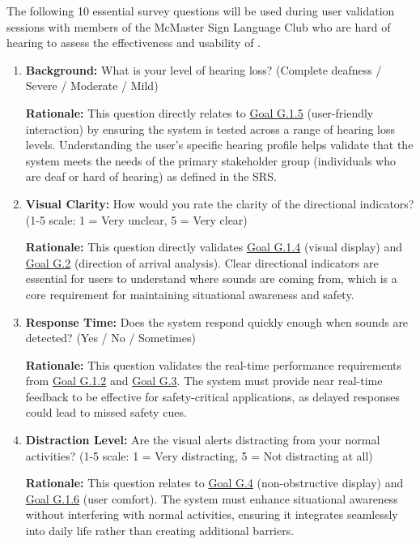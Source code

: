 \documentclass[12pt, titlepage]{article}
\begin{document}
The following 10 essential survey questions will be used during user validation
sessions with members of the McMaster Sign Language Club who are hard of hearing
to assess the effectiveness and usability of .

\begin{enumerate}
    \item \textbf{Background:} What is your level of hearing loss? (Complete
    deafness / Severe / Moderate / Mild)
    
    \textbf{Rationale:} This question directly relates to
    \hyperref[goal:user_friendly_interaction]{Goal G.1.5} (user-friendly
    interaction) by ensuring the system is tested across a range of hearing loss
    levels. Understanding the user's specific hearing profile helps validate
    that the system meets the needs of the primary stakeholder group
    (individuals who are deaf or hard of hearing) as defined in the SRS.
    
    \item \textbf{Visual Clarity:} How would you rate the clarity of the
    directional indicators? (1-5 scale: 1 = Very unclear, 5 = Very clear)
    
    \textbf{Rationale:} This question directly validates
    \hyperref[goal:visual_display]{Goal G.1.4} (visual display) and
    \hyperref[goal:audio_direction_analysis]{Goal G.2} (direction of arrival
    analysis). Clear directional indicators are essential for users to
    understand where sounds are coming from, which is a core requirement for
    maintaining situational awareness and safety.
    
    \item \textbf{Response Time:} Does the system respond quickly enough when
    sounds are detected? (Yes / No / Sometimes)
    
    \textbf{Rationale:} This question validates the real-time performance
    requirements from \hyperref[goal:audio_direction_analysis]{Goal G.1.2} and
    \hyperref[goal:audio_identification_analysis]{Goal G.3}. The system must
    provide near real-time feedback to be effective for safety-critical
    applications, as delayed responses could lead to missed safety cues.
    
    \item \textbf{Distraction Level:} Are the visual alerts distracting from
    your normal activities? (1-5 scale: 1 = Very distracting, 5 = Not
    distracting at all)
    
    \textbf{Rationale:} This question relates to
    \hyperref[goal:visual_display]{Goal G.4} (non-obstructive display) and
    \hyperref[goal:user_comfort]{Goal G.1.6} (user comfort). The system must
    enhance situational awareness without interfering with normal activities,
    ensuring it integrates seamlessly into daily life rather than creating
    additional barriers.
    

\end{enumerate}
\end{document}

